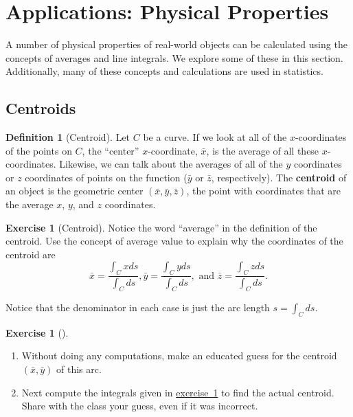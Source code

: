 \documentclass[10pt,]{book}
\newcommand{\terminology}[1]{\textbf{#1}}
\theoremstyle{plain}
\theoremstyle{definition}
\newtheorem{definition}[theorem]{Definition}
\theoremstyle{definition}
\theoremstyle{definition}
\theoremstyle{definition}
\newtheorem{exploration}[project]{Exercise}
\theoremstyle{definition}
\numberwithin{equation}{section}
\begin{document}
\section[{Applications: Physical Properties}]{Applications: Physical Properties}\label{section-33}
A number of physical properties of real-world objects can be calculated using the concepts of averages and line integrals. We explore some of these in this section. Additionally, many of these concepts and calculations are used in statistics.%
\typeout{************************************************}
\typeout{************************************************}
\subsection[{Centroids}]{Centroids}\label{subsection-30}
\begin{definition}[{Centroid}]\label{definition-37}
Let \(C\) be a curve. If we look at all of the \(x\)-coordinates of the points on \(C\), the ``center'' \(x\)-coordinate, \(\bar x\), is the average of all these \(x\)-coordinates. Likewise, we can talk about the averages of all of the \(y\) coordinates or \(z\) coordinates of points on the function (\(\bar y\) or \(\bar z\), respectively). The \terminology{centroid} of an object is the geometric center \((\bar x, \bar y, \bar z)\), the point with coordinates that are the average \(x\), \(y\), and \(z\) coordinates.%
\end{definition}
\begin{exploration}[Centroid]\label{prob_centroid_of_curve}
Notice the word ``average'' in the definition of the centroid. Use the concept of average value to explain why the coordinates of the centroid are %
\begin{equation*}
\bar x = \frac{\int_C x ds}{\int_C  ds},
\bar y = \frac{\int_C y ds}{\int_C  ds}, 
\text{ and } 
\bar z = \frac{\int_C z ds}{\int_C  ds}.
\end{equation*}
%
\par
Notice that the denominator in each case is just the arc length \(s=\int_C ds\).%
\end{exploration}
\begin{exploration}[]\label{prob_semicircle_centroid}
\leavevmode%
\begin{enumerate}[font=\bfseries,label=(\alph*),ref=\alph*]
\item\label{task-557} Without doing any computations, make an educated guess for the centroid \((\bar x, \bar y)\) of this arc.%
\item\label{task-558} Next compute the integrals given in \hyperref[prob_centroid_of_curve]{exercise~1} to find the actual centroid. Share with the class your guess, even if it was incorrect.%
\end{enumerate}
\end{exploration}
\typeout{************************************************}
\typeout{************************************************}
\end{document}
